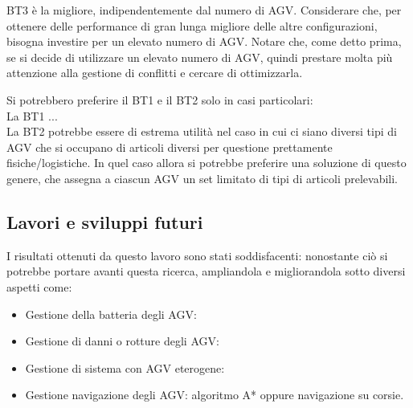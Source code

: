 \documentclass[12pt]{article}
\begin{document}
\noindent BT3 è la migliore, indipendentemente dal numero di AGV. Considerare che, per ottenere delle performance di gran lunga migliore delle altre configurazioni, bisogna investire per un elevato numero di AGV. Notare che, come detto prima, se si decide di utilizzare un elevato numero di AGV,  quindi prestare molta più attenzione alla gestione di conflitti e cercare di ottimizzarla.

\noindent Si potrebbero preferire il BT1 e il BT2 solo in casi particolari:\\
La BT1 ...\\
La BT2 potrebbe essere di estrema utilità nel caso in cui ci siano diversi tipi di AGV che si occupano di articoli diversi per questione prettamente fisiche/logistiche. In quel caso allora si potrebbe preferire una soluzione di questo genere, che assegna a ciascun AGV un set limitato di tipi di articoli prelevabili.

\newpage

\subsection{Lavori e sviluppi futuri}
I risultati ottenuti da questo lavoro sono stati soddisfacenti: nonostante ciò si potrebbe portare avanti questa ricerca, ampliandola e migliorandola sotto diversi aspetti come:
\begin{itemize}
\item Gestione della batteria degli AGV:
\item Gestione di danni o rotture degli AGV:
\item Gestione di sistema con AGV eterogene:
\item Gestione navigazione degli AGV: algoritmo A* oppure navigazione su corsie.
\end{itemize}

\newpage


\end{document}
